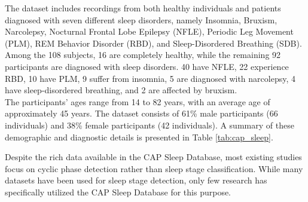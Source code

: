 The dataset includes recordings from both healthy individuals and patients diagnosed with seven different sleep disorders, namely Insomnia, Bruxism, Narcolepsy, Nocturnal Frontal Lobe Epilepsy (NFLE), Periodic Leg Movement (PLM), REM Behavior Disorder (RBD), and Sleep-Disordered Breathing (SDB).  Among the 108 subjects, 16 are completely healthy, while the remaining 92 participants are diagnosed with sleep disorders. 40 have NFLE, 22 experience RBD, 10 have PLM, 9 suffer from insomnia, 5 are diagnosed with narcolepsy, 4 have sleep-disordered breathing, and 2 are affected by bruxism. \\

The participants' ages range from 14 to 82 years, with an average age of approximately 45 years. The dataset consists of 61\% male participants (66 individuals) and 38\% female participants (42 individuals). A summary of these demographic and diagnostic details is presented in Table \ref{tab:cap_sleep}.\\

\begin{table}[H]
    \centering
    \small %
    \caption{Summary of CAP Sleep Database}
    \label{tab:cap_sleep}
\end{table}


Despite the rich data available in the CAP Sleep Database, most existing studies focus on cyclic phase detection rather than sleep stage classification. While many datasets have been used for sleep stage detection, only few research has specifically utilized the CAP Sleep Database for this purpose.

